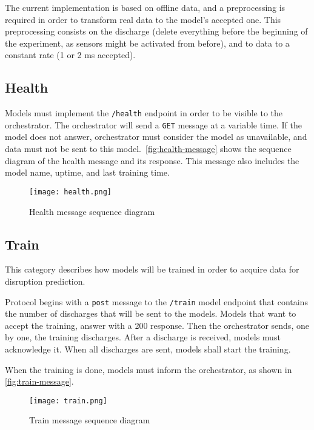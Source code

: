 The current implementation is based on offline data, and a preprocessing is required in order to transform real data to the model's accepted one. This preprocessing consists on  the discharge (delete everything before the beginning of the experiment, as sensors might be activated from before), and to  data to a constant rate (1 or 2 ms accepted).

\subsection{Health}

Models must implement the \texttt{/health} endpoint in order to be visible to the orchestrator. The orchestrator will send a \texttt{GET} message at a variable time. If the model does not answer, orchestrator must consider the model as unavailable, and data must not be sent to this model.\ \autoref{fig:health-message} shows the sequence diagram of the health message and its response. This message also includes the model name, uptime, and last training time.

\begin{figure}[H]
    \centering
    \texttt{[image: health.png]}
    \caption{Health message sequence diagram}
    \label{fig:health-message}
\end{figure}

\subsection{Train} 

This category describes how models will be trained in order to acquire data for disruption prediction. 

Protocol begins with a \texttt{post} message to the \texttt{/train} model endpoint that contains the number of discharges that will be sent to the models. Models that want to accept the training, answer with a 200 response. Then the orchestrator sends, one by one, the training discharges. After a discharge is received, models must acknowledge it. When all discharges are sent, models shall start the training.

When the training is done, models must inform the orchestrator, as shown in \autoref{fig:train-message}.

\begin{figure}[H]
    \centering
    \texttt{[image: train.png]}
    \caption{Train message sequence diagram}
    \label{fig:train-message}
\end{figure}

